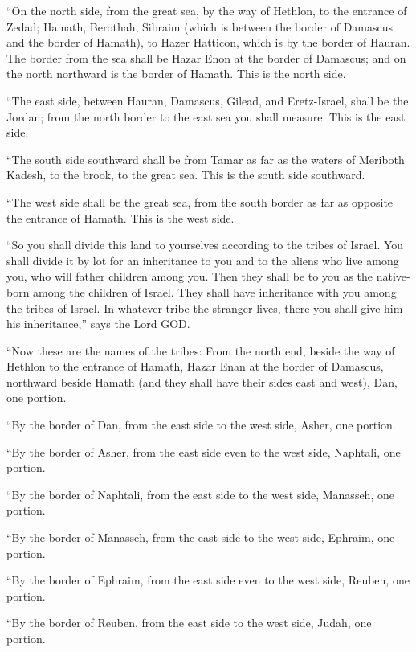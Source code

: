 “On the north side, from the great sea, by the way of Hethlon, to the entrance of Zedad;
\myverse{}Hamath, Berothah, Sibraim (which is between the border of Damascus and the
border of Hamath), to Hazer Hatticon, which is by the border of Hauran.
\myverse{}The border from the sea shall be Hazar Enon at the border of Damascus; and
on the north northward is the border of Hamath. This is the north side.

\myverse{}“The east side, between Hauran, Damascus, Gilead, and Eretz-Israel,
shall be the Jordan; from the north border to the east sea you shall measure. This is the east side.

\myverse{}“The south side southward shall be from Tamar as far as the
waters of Meriboth Kadesh, to the brook, to the great sea. This is the south side southward.

\myverse{}“The west side shall be the great sea, from the south border
as far as opposite the entrance of Hamath. This is the west side.

\myverse{}“So you shall divide this land to yourselves according to the
tribes of Israel.
\myverse{}You shall divide it by lot for an inheritance to you and to the aliens who
live among you, who will father children among you. Then they shall be to you as the native-born among
the children of Israel. They shall have inheritance with you among the tribes of Israel.
\myverse{}In whatever tribe the stranger lives, there you shall give him his inheritance,”
says the Lord GOD.


\mychapter{} \myverse*{}“Now these are the names of the tribes: From the north end, beside
the way of Hethlon to the entrance of Hamath, Hazar Enan at the border of Damascus, northward beside Hamath
(and they shall have their sides east and west), Dan, one portion.

\myverse{}“By the border of Dan, from the east side to the west side, Asher,
one portion.

\myverse{}“By the border of Asher, from the east side even to the west side,
Naphtali, one portion.

\myverse{}“By the border of Naphtali, from the east side to the west side,
Manasseh, one portion.

\myverse{}“By the border of Manasseh, from the east side to the west side,
Ephraim, one portion.

\myverse{}“By the border of Ephraim, from the east side even to the west
side, Reuben, one portion.

\myverse{}“By the border of Reuben, from the east side to the west side,
Judah, one portion.

